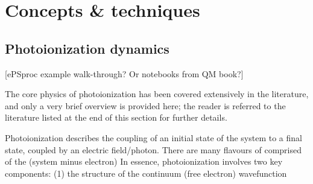 \section{Concepts \& techniques}

\subsection{Photoionization dynamics} 
[ePSproc example walk-through? Or notebooks from QM book?]

The core physics of photoionization has been covered extensively in the literature, and only a very brief overview is provided here; the reader is referred to the literature listed at the end of this section for further details.

Photoionization describes the coupling of an initial state of the system to a final state, coupled by an electric field/photon. There are many flavours of 
comprised of the (system minus electron)  In essence, photoionization involves two key components: (1) the structure of the continuum (free electron) wavefunction 